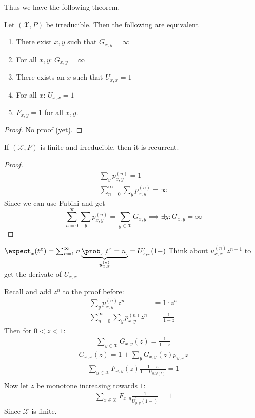 \documentclass[mfit.tex]{subfiles}
\begin{document}
Thus we have the following theorem.

\begin{theorem}
  Let $(\mathcal{X},P)$ be irreducible. Then the following are equivalent
    \begin{enumerate}
      \item  There exist $x,y$ such that $G_{x,y} = \infty$
      \item For all $x,y$: $G_{x,y} = \infty$
      \item There exists an $x$ such that $U_{x,x} = 1$
      \item For all $x$: $U_{x,x} = 1$
      \item $F_{x,y} = 1$ for all $x,y$.
    \end{enumerate}
\end{theorem}

\begin{proof}
  No proof (yet).
\end{proof}

\begin{lemma}
  If $(\mathcal{X},P)$ is finite and irreducible, then it is recurrent.
\end{lemma}

\begin{proof}
  \begin{align*}
    \sum_y p_{x,y}^{(n)} = 1 \\
    \sum_{n=0}^\infty \sum_y p_{x,y}^{(n)} = \infty
  \end{align*}
  Since we can use Fubini and get
  \[ \sum_{n=0}^\infty \sum_y p_{x,y}^{(n)} = \sum_{y \in \mathcal{X}} G_{x,y} \implies \exists y: G_{x,y} = \infty \]
\end{proof}

$\expect_x(t^x) = \sum_{n=1}^\infty n \underbrace{\prob_x[t^x = n]}_{u_{x,x}^{(n)}} = U_{x,x}^\prime (1-)$
Think about $u_{x,x}^{(n)} z^{n-1}$ to get the derivate of $U_{x,x}$


Recall and add $z^n$ to the proof before:
\begin{align*}
  \sum_y p_{x,y}^{(n)} z^n &= 1 \cdot z^n \\
  \sum_{n=0}^\infty \sum_y p_{x,y}^{(n)} z^n &= \frac{1}{1-z}
\end{align*}
Then for $0 < z < 1$:
\begin{align*}
  \sum_{y \in \mathcal{X}} G_{x,y}(z) = \frac{1}{1-z}
\end{align*}
\begin{align*}
  G_{x,x}(z) = 1 + \sum_y G_{x,y}(z) p_{y,x} z
\end{align*}
\begin{align*}
  \sum_{y \in \mathcal{X}} F_{x,y}(z) \frac{1 - z}{1 - U_{y,y(z)}} = 1 \\
\end{align*}
Now let $z$ be monotone increasing towards $1$:
\begin{align*}
  \sum_{x \in \mathcal{X}} F_{x,y} \frac{1}{U_{y,y}^\prime(1-)} = 1
\end{align*}
Since $\mathcal{X}$ is finite.
\end{document}
